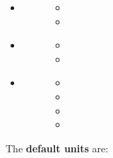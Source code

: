 \documentclass[a4paper,10pt,english]{sphinxmanual}
\begin{document}
\begin{fulllineitems}
\begin{itemize}
\begin{description}
\begin{itemize}
\end{itemize}

\end{description}

\item {} \begin{description}
\item[{}] \leavevmode\begin{itemize}
\item {} 

\item {} 

\end{itemize}

\end{description}

\item {} \begin{description}
\item[{}] \leavevmode\begin{itemize}
\item {} 

\item {} 

\end{itemize}

\end{description}

\item {} \begin{description}
\item[{}] \leavevmode\begin{itemize}
\item {} 

\item {} 

\item {} 

\item {} 

\end{itemize}

\end{description}

\end{itemize}

The \textbf{default units} are:


\end{fulllineitems}
\end{document}
